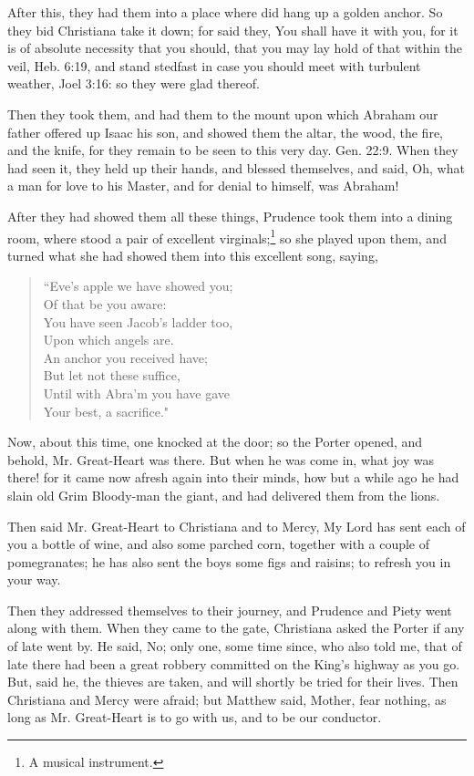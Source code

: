 After this, they had them into a place where did hang up a golden anchor. So they bid Christiana take it down; for said they, You shall have it with you, for it is of absolute necessity that you should, that you may lay hold of that within the veil, Heb. 6:19, and stand stedfast in case you should meet with turbulent weather, Joel 3:16: so they were glad thereof.

Then they took them, and had them to the mount upon which Abraham our father offered up Isaac his son, and showed them the altar, the wood, the fire, and the knife, for they remain to be seen to this very day. Gen. 22:9. When they had seen it, they held up their hands, and blessed themselves, and said, Oh, what a man for love to his Master, and for denial to himself, was Abraham!

After they had showed them all these things, Prudence took them into a dining room, where stood a pair of excellent virginals;\footnote{A musical instrument.} so she played upon them, and turned what she had showed them into this excellent song, saying,
\begin{verse}
``Eve's apple we have showed you;\\
Of that be you aware:\\
You have seen Jacob's ladder too,\\
Upon which angels are.\\
An anchor you received have;\\
But let not these suffice,\\
Until with Abra'm you have gave\\
Your best, a sacrifice."\\
\end{verse}

Now, about this time, one knocked at the door; so the Porter opened, and behold, Mr. Great-Heart was there. But when he was come in, what joy was there! for it came now afresh again into their minds, how but a while ago he had slain old Grim Bloody-man the giant, and had delivered them from the lions.

Then said Mr. Great-Heart to Christiana and to Mercy, My Lord has sent each of you a bottle of wine, and also some parched corn, together with a couple of pomegranates; he has also sent the boys some figs and raisins; to refresh you in your way.

Then they addressed themselves to their journey, and Prudence and Piety went along with them. When they came to the gate, Christiana asked the Porter if any of late went by. He said, No; only one, some time since, who also told me, that of late there had been a great robbery committed on the King's highway as you go. But, said he, the thieves are taken, and will shortly be tried for their lives. Then Christiana and Mercy were afraid; but Matthew said, Mother, fear nothing, as long as Mr. Great-Heart is to go with us, and to be our conductor.


